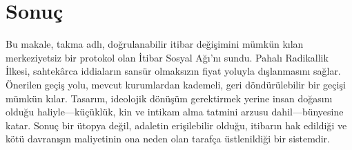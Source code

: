 \documentclass[11pt,a4paper,twocolumn]{article}
\begin{document}
\section{Sonuç}

Bu makale, takma adlı, doğrulanabilir itibar değişimini mümkün kılan merkeziyetsiz bir protokol olan İtibar Sosyal Ağı'nı sundu. Pahalı Radikallik İlkesi, sahtekârca iddiaların sansür olmaksızın fiyat yoluyla dışlanmasını sağlar. Önerilen geçiş yolu, mevcut kurumlardan kademeli, geri döndürülebilir bir geçişi mümkün kılar. Tasarım, ideolojik dönüşüm gerektirmek yerine insan doğasını olduğu haliyle---küçüklük, kin ve intikam alma tatmini arzusu dahil---bünyesine katar. Sonuç bir ütopya değil, adaletin erişilebilir olduğu, itibarın hak edildiği ve kötü davranışın maliyetinin ona neden olan tarafça üstlenildiği bir sistemdir.


\end{document}
